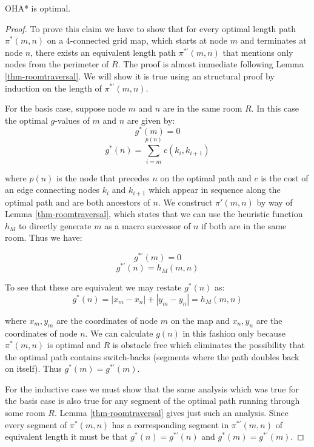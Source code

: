 \begin{theorem}
OHA* is optimal. 
\end{theorem}
\begin{proof}
To prove this claim we have to show that for every optimal length path $\pi^*(m, n)$ 
on a 4-connected grid map, which starts at node $m$ and terminates at node $n$, 
there exists an equivalent length path $\pi^{*'}(m, n)$ that mentions only nodes from the
perimeter of $R$.
The proof is almost immediate following Lemma \ref{thm-roomtraversal}. 
We will show it is true using an structural proof by induction on the length
of $\pi^{*'}(m, n)$.
\par
For the basis case, suppose node $m$ and $n$ are in the same room $R$.
In this case the optimal $g$-values of $m$ and $n$ are given by:
$$g^*(m) = 0$$
$$ g^*(n) =  \sum_{i = m}^{p(n)}c(k_{i}, k_{i+1})$$ 

where $p(n)$ is the node that precedes $n$ on the optimal path and $c$ is the cost of 
an edge connecting nodes $k_{i}$ and $k_{i+1}$ which appear in sequence along the optimal path 
and are both ancestors of $n$.
We construct $\pi'(m, n)$ by way of Lemma \ref{thm-roomtraversal}, 
which states that we can use the heuristic function $h_{M}$ to directly generate $m$ as a 
macro successor of $n$ if both are in the same room.
Thus we have:

$$ g^{*'}(m) = 0 $$
$$ g^{*'}(n) = h_{M}(m, n)$$

To see that these are equivalent we may restate $g^*(n)$ as:
$$g^*(n) = |x_{m} - x_{n}| + |y_{m} - y_{n}| = h_{M}(m, n)$$

where $x_{m}, y_{m}$ are the coordinates of node $m$ on the map and $x_{n}, y_{n}$ are
the coordinates of node $n$.
We can calculate $g(n)$ in this fashion only because $\pi^*(m,n)$ is optimal and $R$ is
obstacle free which eliminates the possibility that the optimal path contains
 switch-backs (segments where the path doubles back on itself).
Thus $g^{*}(m) = g^{*'}(m)$.
\par
For the inductive case we must show that the same analysis which was true for the basis case
is also true for any segment of the optimal path running through some room $R$. 
Lemma \ref{thm-roomtraversal} gives just such an analysis.
Since every segment of $\pi^{*}(m, n)$ has a corresponding segment in $\pi^{*'}(m, n)$ of equivalent
length it must be that $g^*(n) = g^{*'}(n)$ and $g^*(m) = g^{*'}(m)$.
\end{proof}

